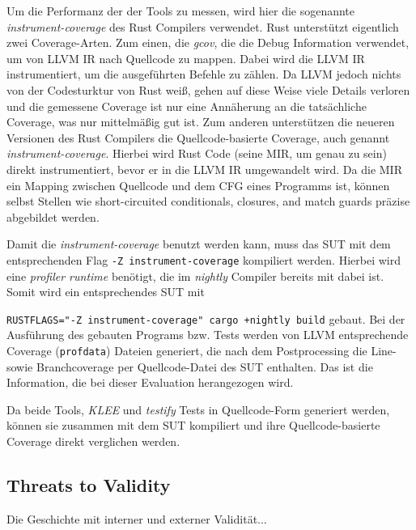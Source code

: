 \documentclass{article}
\begin{document}
Um die Performanz der der Tools zu messen, wird hier die sogenannte \textit{instrument-coverage} des Rust Compilers verwendet. Rust unterstützt eigentlich zwei Coverage-Arten. Zum einen, die \textit{gcov}, die die Debug Information verwendet, um von LLVM IR nach Quellcode zu mappen. Dabei wird die LLVM IR instrumentiert, um die ausgeführten Befehle zu zählen. Da LLVM jedoch nichts von der Codesturktur von Rust weiß, gehen auf diese Weise viele Details verloren und die gemessene Coverage ist nur eine Annäherung an die tatsächliche Coverage, was nur mittelmäßig gut ist. Zum anderen unterstützen die neueren Versionen des Rust Compilers die Quellcode-basierte Coverage, auch genannt \textit{instrument-coverage}. Hierbei wird Rust Code (seine MIR, um genau zu sein) direkt instrumentiert, bevor er in die LLVM IR umgewandelt wird. Da die MIR ein Mapping zwischen Quellcode und dem CFG eines Programms ist, können selbst Stellen wie short-circuited conditionals, closures, and match guards präzise abgebildet werden.

Damit die \textit{instrument-coverage} benutzt werden kann, muss das SUT mit dem entsprechenden Flag \lstinline{-Z instrument-coverage} kompiliert werden. Hierbei wird eine \textit{profiler runtime} benötigt, die im \textit{nightly} Compiler bereits mit dabei ist. Somit wird ein entsprechendes SUT mit \raggedright\lstinline{RUSTFLAGS="-Z instrument-coverage" cargo +nightly build} gebaut. Bei der Ausführung des gebauten Programs bzw. Tests werden von LLVM entsprechende Coverage (\lstinline{profdata}) Dateien generiert,  die nach dem Postprocessing die Line- sowie Branchcoverage per Quellcode-Datei des SUT enthalten. Das ist die Information, die bei dieser Evaluation herangezogen wird.

Da beide Tools, \textit{KLEE} und \textit{testify} Tests in Quellcode-Form generiert werden, können sie zusammen mit dem SUT kompiliert und ihre Quellcode-basierte Coverage direkt verglichen werden.



\subsection{Threats to Validity}
Die Geschichte mit interner und externer Validität...
\end{document}
